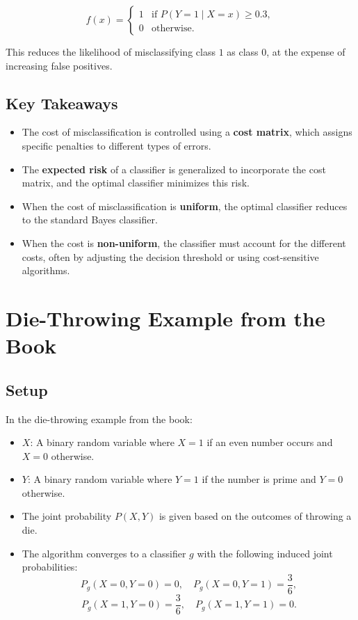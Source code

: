 \begin{notechapter}
\[
f(x) = \begin{cases}
1 & \text{if } P(Y = 1 \mid X = x) \geq 0.3, \\
0 & \text{otherwise}.
\end{cases}
\]

This reduces the likelihood of misclassifying class \( 1 \) as class \( 0 \), at the expense of increasing false positives.

\subsection{Key Takeaways}
\begin{itemize}
    \item The cost of misclassification is controlled using a \textbf{cost matrix}, which assigns specific penalties to different types of errors.
    \item The \textbf{expected risk} of a classifier is generalized to incorporate the cost matrix, and the optimal classifier minimizes this risk.
    \item When the cost of misclassification is \textbf{uniform}, the optimal classifier reduces to the standard Bayes classifier.
    \item When the cost is \textbf{non-uniform}, the classifier must account for the different costs, often by adjusting the decision threshold or using cost-sensitive algorithms.
\end{itemize}

\section{Die-Throwing Example from the Book}

\subsection{Setup}
In the die-throwing example from the book:
\begin{itemize}
    \item \( X \): A binary random variable where \( X = 1 \) if an even number occurs and \( X = 0 \) otherwise.
    \item \( Y \): A binary random variable where \( Y = 1 \) if the number is prime and \( Y = 0 \) otherwise.
    \item The joint probability \( P(X, Y) \) is given based on the outcomes of throwing a die.
    \item The algorithm converges to a classifier \( g \) with the following induced joint probabilities:
      \[
      P_g(X = 0, Y = 0) = 0, \quad P_g(X = 0, Y = 1) = \frac{3}{6},
      \]
      \[
      P_g(X = 1, Y = 0) = \frac{3}{6}, \quad P_g(X = 1, Y = 1) = 0.
      \]
\end{itemize}


\end{notechapter}

